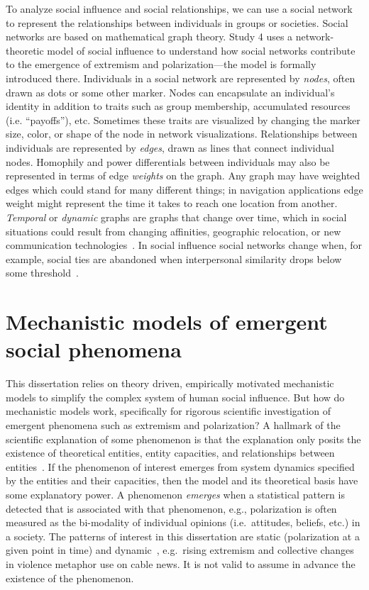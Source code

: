 To analyze social influence and social relationships, we can use a social 
network to represent the relationships between individuals
in groups or societies. 
Social networks are based on mathematical graph theory. Study 4 uses a network-theoretic
model of social influence to understand how social networks contribute to
the emergence of extremism and polarization---the model is formally 
introduced there. Individuals in a social network are represented by \emph{nodes},
often drawn as dots or some other marker. Nodes can encapsulate an individual's
identity in addition to traits such as group
membership, accumulated resources (i.e. ``payoffs''), etc. Sometimes these traits are visualized
by changing the marker size, color, or shape of the node in network visualizations.  Relationships
between individuals are represented by \emph{edges}, drawn as lines that connect
individual nodes.  Homophily and power differentials between individuals 
may also be represented in terms of edge \emph{weights} on the graph. Any graph
may have weighted edges which could stand for many different things; in
navigation applications edge weight might represent the time it takes to reach 
one location from another. \emph{Temporal} or \emph{dynamic} graphs are graphs that change 
over time, which in social situations could result from changing affinities,
geographic relocation, or new communication technologies~\cite{Li2017}. 
In social influence
social networks change when, for example, social ties are abandoned when interpersonal
similarity drops below some threshold~\cite{Axelrod1997,Hegselmann2002,Centola2007,Kossinets2009}.


\section{Mechanistic models of emergent social phenomena}

This dissertation relies on theory driven, empirically motivated mechanistic
models to simplify the complex system of human social influence. But how do
mechanistic models work, specifically for rigorous scientific investigation of
emergent phenomena such as extremism and polarization?
A hallmark of the scientific explanation of some phenomenon is that the explanation
only posits the existence of theoretical entities, entity capacities, 
and relationships between entities~\cite{Kauffman1970,Cartwright1989,Craver2006,Turner2021}. 
If the phenomenon of interest 
emerges from system dynamics specified by the entities and their capacities,
then the model and its theoretical basis have some explanatory power. 
A phenomenon \emph{emerges} when a statistical pattern is detected that is 
associated with that phenomenon, e.g., polarization is often measured as the
bi-modality of individual opinions (i.e.\ attitudes, beliefs, etc.) in a society.
The patterns of interest in this dissertation are static (polarization at a given
point in time) and dynamic~\cite{Kelso1995}, e.g.\ rising extremism and collective changes in 
violence metaphor use on cable news.
It is not valid to assume in advance the existence of the phenomenon. 

